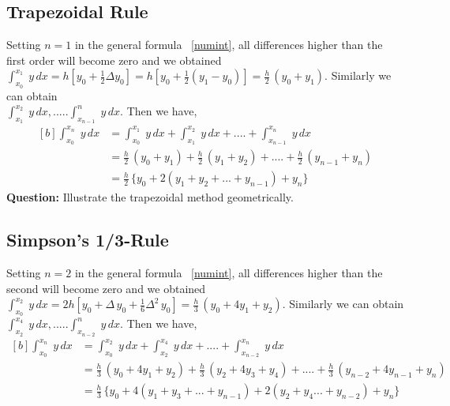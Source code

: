 \documentclass[aima203_lecturenotes_ku.tex]{subfiles}
\begin{document}
\subsection{Trapezoidal Rule}
Setting $n=1$ in the general formula ~\ref{numint}, all differences higher than the first order will become zero and we obtained \\[1mm]
$\displaystyle \int_{x_0}^{x_1} \; y\,dx = h \left [ y_0 + \frac{1}{2} \Delta y_0 \right ] = h \left [ y_0 + \frac{1}{2}(y_1 -y_0) \right ] = \frac{h}{2}\, (y_0 + y_1).$ Similarly we can obtain \\[5mm] $\int_{x_1}^{x_2} \; y\,dx, ..... \int_{x_{n-1}}^n \; y\,dx $. Then we have,
\begin{equation}
  \label{trap}
  \begin{aligned}[b]
    \int_{x_0}^{x_n}\; y\,dx &= \int_{x_0}^{x_1} \; y\,dx + \int_{x_1}^{x_2} \; y\,dx + .... + \int_{x_{n-1}}^{x_n} \; y\,dx \\[1mm]
                             &= \frac{h}{2} \, (y_0 + y_1) + \frac{h}{2} \, (y_1 + y_2) + .... + \frac{h}{2} \, (y_{n-1} + y_n) \\[1mm]
                             &= \frac{h}{2} \, \{ y_0 + 2(y_1 + y_2 + ... + y_{n-1}) + y_n \}
  \end{aligned}
\end{equation}
\textbf{Question:} Illustrate the trapezoidal method geometrically.

\subsection{Simpson's 1/3-Rule}
Setting $n=2$ in the general formula ~\ref{numint}, all differences higher than the second will become zero and we obtained \\[1mm]
$\displaystyle \int_{x_0}^{x_2} \; y\,dx = 2h \left [ y_0 + \Delta \, y_0 + \frac{1}{6} \Delta^2 \, y_0 \right ] = \frac{h}{3}\, (y_0 + 4y_1 + y_2).$ Similarly we can obtain \\[5mm] $\int_{x_2}^{x_4} \; y\,dx, ..... \int_{x_{n-2}}^n \; y\,dx $. Then we have,
\begin{equation}
  \label{simp1}
  \begin{aligned}[b]
    \int_{x_0}^{x_n}\; y\,dx &= \int_{x_0}^{x_2} \; y\,dx + \int_{x_2}^{x_4} \; y\,dx + .... + \int_{x_{n-2}}^{x_n} \; y\,dx \\[1mm]
                             &= \frac{h}{3} \, (y_0 +4y_1 + y_2) + \frac{h}{3} \, (y_2 + 4y_3 + y_4) + .... + \frac{h}{3} \, (y_{n-2} + 4y_{n-1} + y_n) \\[1mm]
                             &= \frac{h}{3} \, \{ y_0 + 4(y_1 + y_3 + ... + y_{n-1}) + 2 (y_2 + y_4  ... + y_{n-2} ) + y_n \}
  \end{aligned}
\end{equation}
\end{document}
